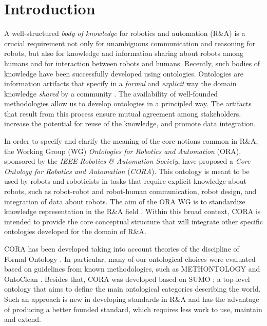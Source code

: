 \documentclass[preprint,12pt]{elsarticle}
\begin{document}
\section{Introduction}



A well-structured \emph{body of knowledge} for robotics and automation (R\&A) is a crucial requirement not only for unambiguous communication and reasoning for robots, but also for knowledge and information sharing about robots among humans and for interaction between robots and humans. Recently, such bodies of knowledge have been successfully developed using ontologies. Ontologies are information artifacts that specify in a \emph{formal} and \emph{explicit} way the domain knowledge \emph{shared} by a community \cite{STUDER1998}. The availability of well-founded methodologies allow us to develop ontologies in a principled way. The artifacts that result from this process ensure mutual agreement among stakeholders, increase the potential for reuse of the knowledge, and promote data integration.

In order to specify and clarify the meaning of the core notions common in R\&A, the Working Group (WG) \emph{Ontologies for Robotics and Automation} (ORA), sponsored by the \emph{IEEE Robotics \& Automation Society}, have proposed a \emph{Core Ontology for Robotics and Automation} (\emph{CORA}). This ontology is meant to be used by robots and roboticists in tasks that require explicit knowledge about robots, such as robot-robot and robot-human communication, robot design, and integration of data about robots. The aim of the ORA WG is to standardize knowledge representation in the R\&A field \cite{schlenoff2012ieee}. Within this broad context, CORA is intended to provide the core conceptual structure that will integrate other specific ontologies developed for the domain of R\&A. 

CORA has been developed taking into account theories of the discipline of Formal Ontology \cite{Guizzardi2005}. In particular, many of our ontological choices were evaluated based on guidelines from known methodologies, such as METHONTOLOGY \cite{Fernandez97} and OntoClean \cite{Guarino2009}. Besides that, CORA was developed based on SUMO \cite{SUMO}; a top-level ontology that aims to define the main ontological categories describing the world. Such an approach is new in developing standards in R\&A and has the advantage of producing a better founded standard, which requires less work to use, maintain and extend.
\end{document}
